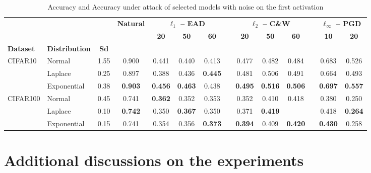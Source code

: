 \begin{table}[htbp]
  \caption{Accuracy and Accuracy under attack of selected models with noise on the first activation}
   \label{table:ap2-attack_noise_activation-appendix}%
    \begin{tabular}{llcccccccccccc}
    \toprule
      & & & \multirow{2}[3]{*}{\textbf{Natural}} & \multicolumn{3}{c}{\textbf{$\ell_1$ -- EAD}} & & \multicolumn{3}{c}{\textbf{$\ell_2$ -- C\&W}} & & \multicolumn{2}{c}{\textbf{$\ell_\infty$ -- PGD}} \\
      \cmidrule{5-7}\cmidrule{9-11}\cmidrule{13-14} & & & & \textbf{20} & \textbf{50} & \textbf{60} & & \textbf{20} & \textbf{50} & \textbf{60} &       & \textbf{10} & \textbf{20} \\
      \textbf{Dataset} & \multicolumn{1}{c}{\textbf{Distribution}} & \textbf{Sd} & & & & & & & & & & &  \\
    \midrule
    \multirow{3}[1]{*}{CIFAR10} & Normal & 1.55  & 0.900 & 0.441 & 0.440 & 0.413 & & 0.477 & 0.482 & 0.484 & & 0.683 & 0.526 \\
     & Laplace & 0.25  & 0.897 & 0.388 & 0.436 & \textbf{0.445} & & 0.481 & 0.506 & 0.491 & & 0.664 & 0.493 \\
     & Exponential & 0.38  & \textbf{0.903} & \textbf{0.456} & \textbf{0.463} & 0.438 & & \textbf{0.495} & \textbf{0.516} & \textbf{0.506} &       & \textbf{0.697} & \textbf{0.557} \\
    \midrule
    \multirow{3}[2]{*}{CIFAR100} & Normal & 0.45  & 0.741 & \textbf{0.362} & 0.352 & 0.353 & & 0.352 & 0.410 & 0.418 & & 0.380 & 0.250 \\
     & Laplace & 0.10  & \textbf{0.742} & 0.350 & \textbf{0.367} & 0.350 & & 0.371 & \textbf{0.419} & & & 0.418 & \textbf{0.264} \\
     & Exponential & 0.15  & 0.741 & 0.354 & 0.356 & \textbf{0.373} & & \textbf{0.394} & 0.409 & \textbf{0.420} & & \textbf{0.430} & 0.258 \\
    \bottomrule
    \end{tabular}%
\end{table}%



\section{Additional discussions on the experiments}

